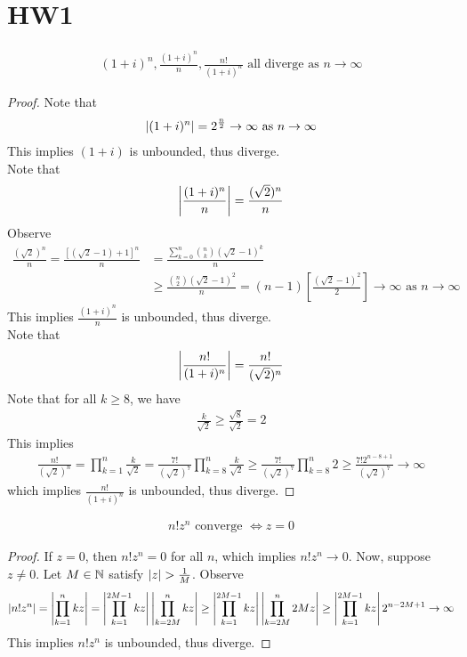 \documentclass{report}
\begin{document}
\section{HW1}
\begin{theorem}
\begin{align*}
  (1+i)^n, \frac{(1+i)^n}{n},\frac{n!}{(1+i)^n}\text{ all diverge as }n\to \infty
\end{align*}
\begin{proof}
Note that 
\begin{align*}
\left|(1+i)^n\right|=2^{\frac{n}{2}}\to \infty\text{ as }n\to \infty
\end{align*}
This implies $(1+i)$ is unbounded, thus diverge.\\

Note that 
\begin{align*}
\left|\frac{(1+i)^n}{n}\right|=\frac{(\sqrt{2})^n}{n}
\end{align*}
Observe 
\begin{align*}
\frac{(\sqrt{2})^n}{n}= \frac{[(\sqrt{2}-1)+1]^n}{n}&=\frac{\sum_{k=0}^n \binom{n}{k}(\sqrt{2}-1)^k}{n}\\
&\geq \frac{\binom{n}{2}(\sqrt{2}-1 )^2}{n}=(n-1) [\frac{(\sqrt{2}-1 )^2}{2}]\to \infty\text{ as }n\to \infty
\end{align*}
This implies $\frac{(1+i)^n}{n}$ is unbounded, thus diverge. \\

Note that 
\begin{align*}
\left|\frac{n!}{(1+i)^n}\right|= \frac{n!}{(\sqrt{2})^n}
\end{align*}
Note that for all $k\geq 8$, we have 
\begin{align*}
\frac{k}{\sqrt{2}}\geq \frac{\sqrt{8}}{\sqrt{2}}=2
\end{align*}
This implies 
\begin{align*}
  \frac{n!}{(\sqrt{2})^n}=\prod_{k=1}^n \frac{k}{\sqrt{2}}= \frac{7!}{(\sqrt{2})^7}\prod_{k=8}^n \frac{k}{\sqrt{2}}\geq \frac{7!}{(\sqrt{2})^7}\prod_{k=8}^n 2\geq \frac{7!2^{n-8+1}}{(\sqrt{2})^7}\to \infty
\end{align*}
which implies $\frac{n!}{(1+i)^n}$ is unbounded, thus diverge.
\end{proof}
\end{theorem}
\begin{theorem}
  \begin{align*}
  n!z^n\text{ converge }\iff z=0
  \end{align*}
\end{theorem}
\begin{proof}
If $z=0$, then  $n!z^n=0$ for all  $n$, which implies  $n!z^n\to 0$. Now, suppose $z\neq 0$. Let $M\in\mathbb{N}$ satisfy $\abso{z}>\frac{1}{M}$. Observe 
\begin{align*}
\left|n!z^n\right|=\left|\prod_{k=1}^n kz\right|=\left|\prod_{k=1}^{2M-1} kz \right| \left|\prod_{k=2M}^{n} kz \right|\geq \left|\prod_{k=1}^{2M-1}kz\right|\left|\prod_{k=2M}^n 2Mz\right|\geq \left|\prod_{k=1}^{2M-1}kz\right|2^{n-2M+1}\to \infty
\end{align*}
This implies $n!z^n$ is unbounded, thus diverge.
\end{proof}
\end{document}
